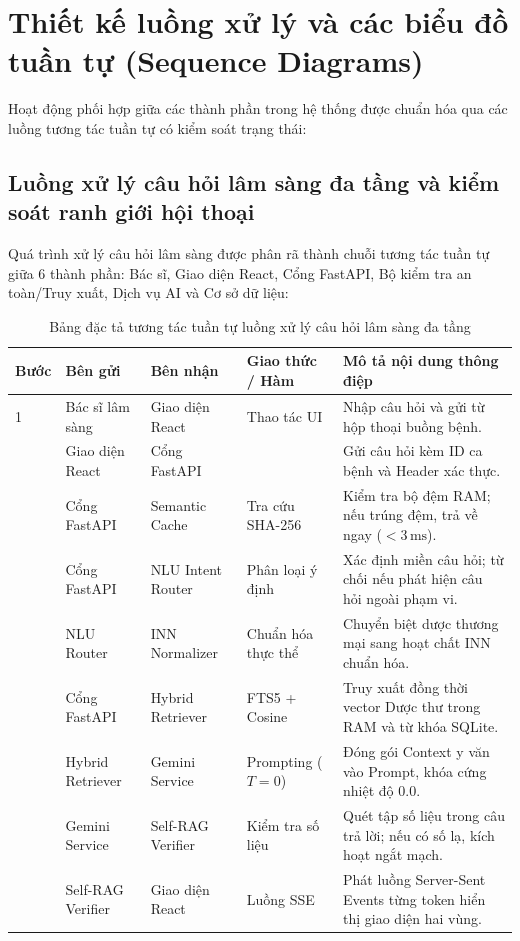 \section{Thiết kế luồng xử lý và các biểu đồ tuần tự (Sequence Diagrams)}
\label{sec:sequence_diagrams}

Hoạt động phối hợp giữa các thành phần trong hệ thống được chuẩn hóa qua các luồng tương tác tuần tự có kiểm soát trạng thái:

\subsection{Luồng xử lý câu hỏi lâm sàng đa tầng và kiểm soát ranh giới hội thoại}
Quá trình xử lý câu hỏi lâm sàng được phân rã thành chuỗi tương tác tuần tự giữa 6 thành phần: Bác sĩ, Giao diện React, Cổng FastAPI, Bộ kiểm tra an toàn/Truy xuất, Dịch vụ AI và Cơ sở dữ liệu:

\begin{table}[htbp]
\centering
\small
\renewcommand{\arraystretch}{1.15}
\begin{tabularx}{\textwidth}{C{1.0cm} L{3.0cm} L{3.0cm} L{2.5cm} Y}
\toprule
\textbf{Bước} & \textbf{Bên gửi} & \textbf{Bên nhận} & \textbf{Giao thức / Hàm} & \textbf{Mô tả nội dung thông điệp} \\
 & Bác sĩ lâm sàng & Giao diện React & Thao tác UI & Nhập câu hỏi và gửi từ hộp thoại buồng bệnh. \\
 & Giao diện React & Cổng FastAPI &  & Gửi câu hỏi kèm ID ca bệnh và Header xác thực. \\
 & Cổng FastAPI & Semantic Cache & Tra cứu SHA-256 & Kiểm tra bộ đệm RAM; nếu trúng đệm, trả về ngay ($< 3\,\text{ms}$). \\
 & Cổng FastAPI & NLU Intent Router & Phân loại ý định & Xác định miền câu hỏi; từ chối nếu phát hiện câu hỏi ngoài phạm vi. \\
 & NLU Router & INN Normalizer & Chuẩn hóa thực thể & Chuyển biệt dược thương mại sang hoạt chất INN chuẩn hóa. \\
 & Cổng FastAPI & Hybrid Retriever & FTS5 + Cosine & Truy xuất đồng thời vector Dược thư trong RAM và từ khóa SQLite. \\
 & Hybrid Retriever & Gemini Service & Prompting ($T=0$) & Đóng gói Context y văn vào Prompt, khóa cứng nhiệt độ $0.0$. \\
 & Gemini Service & Self-RAG Verifier & Kiểm tra số liệu & Quét tập số liệu trong câu trả lời; nếu có số lạ, kích hoạt ngắt mạch. \\
 & Self-RAG Verifier & Giao diện React & Luồng SSE & Phát luồng Server-Sent Events từng token hiển thị giao diện hai vùng. \\
\bottomrule
\end{tabularx}
\caption{Bảng đặc tả tương tác tuần tự luồng xử lý câu hỏi lâm sàng đa tầng}
\label{tab:seq_clinical_query}
\end{table}

